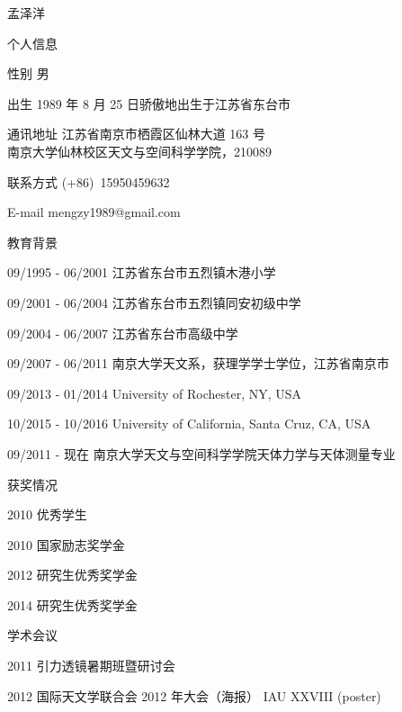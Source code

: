 \begin{resume}

\begin{cv}{\hfill 孟泽洋}
\begin{cvlist}{个人信息}
\setlength{\itemsep}{-0.250\baselineskip plus 0.2em minus 0.2em}
\item[性别] 男
\item[出生]  1989 年 8 月 25 日骄傲地出生于江苏省东台市
\item[通讯地址]  江苏省南京市栖霞区仙林大道 163 号 \\
 			 南京大学仙林校区天文与空间科学学院，210089 
\item[联系方式]   (+86)~15950459632
\item[E-mail] mengzy1989@gmail.com
\end{cvlist}
\begin{cvlist}{教育背景}
\setlength{\itemsep}{-0.250\baselineskip plus 0.2em minus 0.2em}
\item[09/1995 - 06/2001] 江苏省东台市五烈镇木港小学
\item[09/2001 - 06/2004] 江苏省东台市五烈镇同安初级中学
\item[09/2004 - 06/2007] 江苏省东台市高级中学
\item[09/2007 - 06/2011] 南京大学天文系，获理学学士学位，江苏省南京市
\item[09/2013 - 01/2014] University of Rochester, NY, USA
\item[10/2015 - 10/2016] University of California, Santa Cruz, CA, USA
\item[09/2011 - 现在]  南京大学天文与空间科学学院天体力学与天体测量专业
\end{cvlist}
\begin{cvlist}{获奖情况}
\setlength{\itemsep}{-0.250\baselineskip plus 0.2em minus 0.2em}
\item[2010]  优秀学生
\item[2010]  国家励志奖学金
\item[2012]  研究生优秀奖学金
\item[2014]  研究生优秀奖学金
\end{cvlist}
\begin{cvlist}{学术会议}
\setlength{\itemsep}{-0.250\baselineskip plus 0.2em minus 0.2em}
\item[2011]   引力透镜暑期班暨研讨会
\item[2012]   国际天文学联合会 2012 年大会（海报） IAU XXVIII (poster)

\end{cvlist}
\end{cv}
\end{resume}
